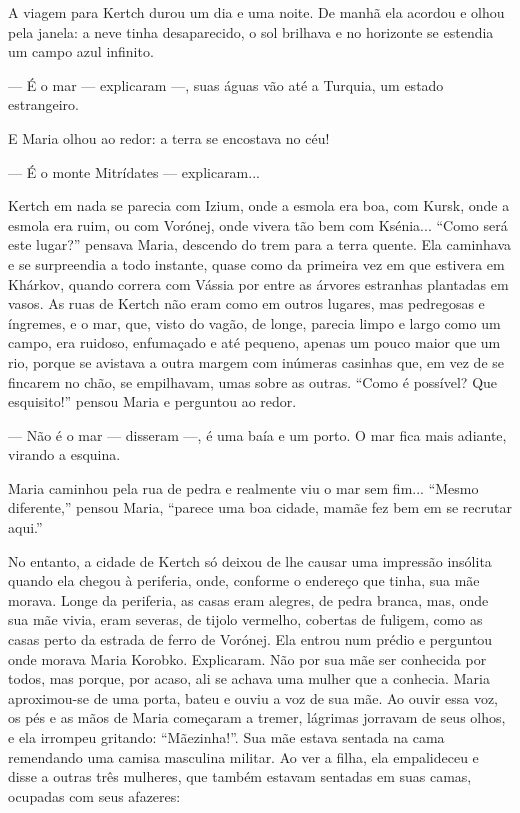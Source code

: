 A viagem para Kertch durou um dia e uma noite. De manhã ela acordou e
olhou pela janela: a neve tinha desaparecido, o sol brilhava e no
horizonte se estendia um campo azul infinito.

--- É o mar --- explicaram ---, suas águas vão até a Turquia, um estado
estrangeiro.

E Maria olhou ao redor: a terra se encostava no céu!

--- É o monte Mitrídates --- explicaram...

Kertch em nada se parecia com Izium, onde a esmola era boa, com Kursk,
onde a esmola era ruim, ou com Vorónej, onde vivera tão bem com
Ksénia... ``Como será este lugar?'' pensava Maria, descendo do trem para
a terra quente. Ela caminhava e se surpreendia a todo instante, quase
como da primeira vez em que estivera em Khárkov, quando correra com
Vássia por entre as árvores estranhas plantadas em vasos. As ruas de
Kertch não eram como em outros lugares, mas pedregosas e íngremes, e o
mar, que, visto do vagão, de longe, parecia limpo e largo como um campo,
era ruidoso, enfumaçado e até pequeno, apenas um pouco maior que um rio,
porque se avistava a outra margem com inúmeras casinhas que, em vez de
se fincarem no chão, se empilhavam, umas sobre as outras. ``Como é
possível? Que esquisito!'' pensou Maria e perguntou ao redor.

--- Não é o mar --- disseram ---, é uma baía e um porto. O mar fica mais
adiante, virando a esquina.

Maria caminhou pela rua de pedra e realmente viu o mar sem fim...
``Mesmo diferente,'' pensou Maria, ``parece uma boa cidade, mamãe fez
bem em se recrutar aqui.''

No entanto, a cidade de Kertch só deixou de lhe causar uma impressão
insólita quando ela chegou à periferia, onde, conforme o endereço que
tinha, sua mãe morava. Longe da periferia, as casas eram alegres, de
pedra branca, mas, onde sua mãe vivia, eram severas, de tijolo vermelho,
cobertas de fuligem, como as casas perto da estrada de ferro de Vorónej.
Ela entrou num prédio e perguntou onde morava Maria Korobko. Explicaram.
Não por sua mãe ser conhecida por todos, mas porque, por acaso, ali se
achava uma mulher que a conhecia. Maria aproximou-se de uma porta, bateu
e ouviu a voz de sua mãe. Ao ouvir essa voz, os pés e as mãos de Maria
começaram a tremer, lágrimas jorravam de seus olhos, e ela irrompeu
gritando: ``Mãezinha!''. Sua mãe estava sentada na cama remendando uma
camisa masculina militar. Ao ver a filha, ela empalideceu e disse a
outras três mulheres, que também estavam sentadas em suas camas,
ocupadas com seus afazeres:

